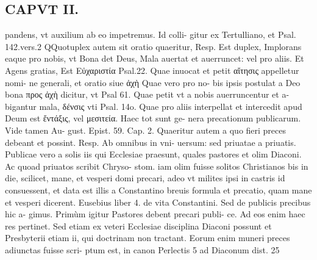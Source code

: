\documentclass{article}
\begin{document}
\begin{pages}
\section*{CAPVT II. }
\marginpar{[ p.43 ]}\pstart pandens, vt auxilium ab eo impetremus. Id colli- gitur ex Tertulliano, et Psal. 142.vers.2  \pend\pstart QQuotuplex autem sit oratio quaeritur, Resp. Est duplex, Implorans eaque  pro nobis, vt Bona det Deus, Mala auertat et auerruncet: vel pro aliis. Et Agens gratias, Est Εὐχαριστία Psal.22.  \pend\pstart Quae inuocat et petit αἴτησις appelletur nomi- ne generali, et oratio siue ἀχὴ  Quae vero pro no- bis ipsis postulat a Deo bona προς ἀχὴ  dicitur, vt Psal 61. Quae petit vt a nobis auerruncentur et a- bigantur mala, δένσις vti Psal. 14o.  \pend\pstart Quae pro aliis interpellat et intercedit apud Deum est ἔντάξις, vel μεσιτεία. Haec tot sunt ge- nera precationum publicarum. Vide tamen Au- gust. Epist. 59.  \pend\pstart Cap. 2. Quaeritur autem a quo fieri preces debeant et possint. Resp. Ab omnibus in vni- uersum: sed priuatae a priuatis. Publicae vero a solis iis qui Ecclesiae praesunt, quales pastores et olim Diaconi. Ac quoad priuatos scribit Chryso- stom. iam olim fuisse solitos Christianos bis in die, scilicet, mane, et vesperi domi precari, adeo vt milites ipsi in castris id consuessent, et data est illis a Constantino breuis formula et precatio, quam mane et vesperi dicerent. Eusebius liber 4. de vita Constantini. Sed de publicis precibus hic a- gimus.  \pend\pstart Primùm igitur Pastores debent precari publi- ce. Ad eos enim haec res pertinet. Sed etiam ex veteri Ecclesiae disciplina Diaconi possunt et Presbyterii etiam ii, qui doctrinam non tractant. Eorum enim muneri preces adiunctas fuisse scri- ptum est, in canon Perlectis 5 ad Diaconum dist. 25  \pend

\end{pages}
\end{document}
